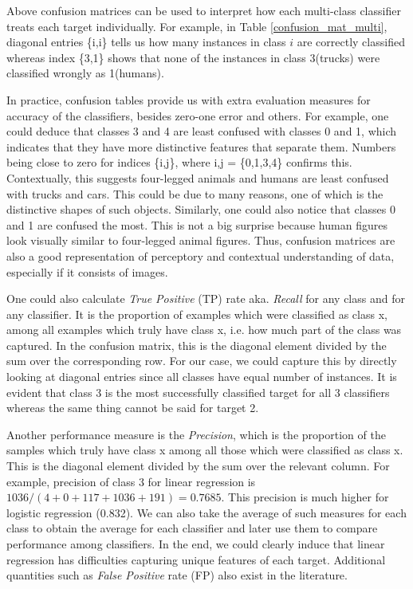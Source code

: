 \documentclass[10pt]{article}
\begin{document}
Above confusion matrices can be used to interpret how each multi-class classifier treats each target individually. For example, in Table \ref{confusion_mat_multi}, diagonal entries \{i,i\} tells us how many instances in class $i$ are correctly classified whereas index \{3,1\} shows that none of the instances in class 3(trucks) were classified wrongly as 1(humans).

In practice, confusion tables provide us with extra evaluation measures for accuracy of the classifiers, besides zero-one error and others. For example, one could deduce that classes 3 and 4 are least confused with classes 0 and 1, which indicates that they have more distinctive features that separate them. Numbers being close to zero for indices \{i,j\}, where i,j = \{0,1,3,4\} confirms this. Contextually, this suggests four-legged animals and humans are least confused with trucks and cars. This could be due to many reasons, one of which is the distinctive shapes of such objects. Similarly, one could also notice that classes 0 and 1 are confused the most. This is not a big surprise because human figures look visually similar to four-legged animal figures. Thus, confusion matrices are also a good representation of perceptory and contextual understanding of data, especially if it consists of images.

One could also calculate \textit{True Positive} (TP) rate aka. \textit{Recall} for any class and for any classifier. It is the proportion of examples which were classified as class x, among all examples which truly have class x, i.e. how much part of the class was captured. In the confusion matrix, this is the diagonal element divided by the sum over the corresponding row. For our case, we could capture this by directly looking at diagonal entries since all classes have equal number of instances. It is evident that class 3 is the most successfully classified target for all 3 classifiers whereas the same thing cannot be said for target 2.

Another performance measure is the \textit{Precision}, which is the proportion of the samples which truly have class x among all those which were classified as class x. This is the diagonal element divided by the sum over the relevant column. For example, precision of class 3 for linear regression is $ 1036/(4+0+117+1036+191) = 0.7685$. This precision is much higher for logistic regression (0.832). We can also take the average of such measures for each class to obtain the average for each classifier and later use them to compare performance among classifiers. In the end, we could clearly induce that linear regression has difficulties capturing unique features of each target. Additional quantities such as \textit{False Positive} rate (FP) also exist in the literature. 
\end{document}

